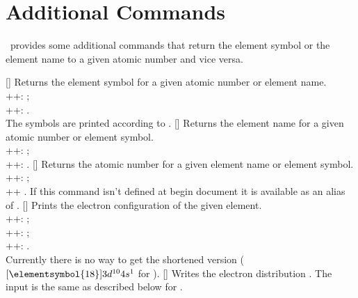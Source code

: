 \documentclass[load-preamble+]{cnltx-doc}
\begin{document}
\section{Additional Commands}\label{sec:additional-commands}
\BOHR\ provides some additional commands that return the element symbol or the
element name to a given atomic number and vice versa.
\begin{commands}
  []
    Returns the element symbol for a given atomic number or element name.\\
    \verbcode++: ;\\
    \verbcode++: .\\
    The symbols are printed according to .
  []
    Returns the element name for a given atomic number or element symbol.\\
    \verbcode++: ;\\
    \verbcode++: .
  []
    Returns the atomic number for a given element name or element symbol.\\
    \verbcode++: ;\\
    \verbcode++ .
    If this command isn't defined at begin document it is available as an
    alias of .
  []
    Prints the electron configuration of the given
    element.\\
    \verbcode++: ;\\
    \verbcode++: ;\\
    \verbcode++: .\\
    Currently there is no way to get the shortened version
    (\eg\ $[\elementsymbol{18}]3d^{10}4s^1$ for ).
  []
    Writes the electron distribution .  The input is the same as described below for
    .\\

\end{commands}
\end{document}
